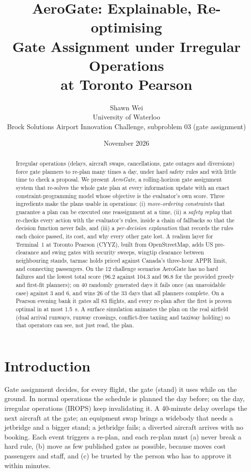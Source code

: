 \documentclass[11pt]{article}
\title{\textbf{AeroGate: Explainable, Re-optimising\\ Gate Assignment under Irregular Operations\\ at Toronto Pearson}}
\author{Shawn Wei\\ University of Waterloo\\ \small Brock Solutions Airport Innovation Challenge, subproblem 03 (gate assignment)}
\date{November 2026}
\theoremstyle{remark}
\begin{document}
\maketitle

\begin{abstract}
Irregular operations (delays, aircraft swaps, cancellations, gate outages and diversions) force gate
planners to re-plan many times a day, under hard safety rules and with little time to check a
proposal. We present \emph{AeroGate}, a rolling-horizon gate assignment system that re-solves the
whole gate plan at every information update with an exact constraint-programming model whose
objective is the evaluator's own score. Three ingredients make the plans usable in operations:
(i) \emph{move-ordering constraints} that guarantee a plan can be executed one reassignment at a time,
(ii) a \emph{safety replay} that re-checks every action with the evaluator's rules, inside a chain of
fallbacks so that the decision function never fails, and (iii) a \emph{per-decision explanation} that
records the rules each choice passed, its cost, and why every other gate lost. A realism layer for
Terminal~1 at Toronto Pearson (CYYZ), built from OpenStreetMap, adds US pre-clearance and swing gates
with security sweeps, wingtip clearance between neighbouring stands, tarmac holds priced against
Canada's three-hour APPR limit, and connecting passengers. On the 12 challenge scenarios AeroGate
has no hard failures and the lowest total score (96.2 against 104.3 and 96.8 for the provided
greedy and first-fit planners); on 40 randomly generated days it fails once (an unavoidable case)
against 3 and 6, and wins 26 of the 33 days that all planners complete. On a Pearson evening bank
it gates all 83 flights, and every re-plan after the first is proven optimal in at most 1.5~s. A
surface simulation animates the plan on the real airfield (dual arrival runways, runway crossings,
conflict-free taxiing and taxiway holding) so that operators can see, not just read, the plan.
\end{abstract}

\section{Introduction}
Gate assignment decides, for every flight, the gate (stand) it uses while on the ground. In normal
operations the schedule is planned the day before; on the day, irregular operations (IROPS) keep
invalidating it. A 40-minute delay overlaps the next aircraft at the gate; an equipment swap brings a
widebody that needs a jetbridge and a bigger stand; a jetbridge fails; a diverted aircraft arrives
with no booking. Each event triggers a re-plan, and each re-plan must (a) never break a hard rule,
(b) move as few published gates as possible, because moves cost passengers and staff, and (c) be
trusted by the person who has to approve it within minutes.
\end{document}
